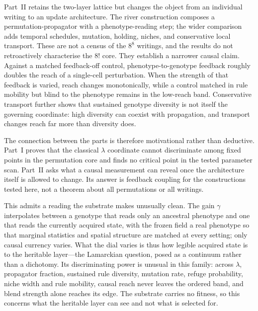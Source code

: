 \documentclass[man,12pt,floatsintext,donotrepeattitle]{apa7}
\begin{document}
Part~II retains the two-layer lattice but changes the object from an individual
writing to an update architecture. The river construction composes a
permutation-propagator with a phenotype-reading step; the wider comparison adds
temporal schedules, mutation, holding, niches, and conservative local
transport. These are not a census of the $8^8$ writings, and the results do not
retroactively characterise the $8!$ core. They establish a narrower causal
claim. Against a matched feedback-off control, phenotype-to-genotype feedback
roughly doubles the reach of a single-cell perturbation. When the strength of
that feedback is varied, reach changes monotonically, while a control matched
in rule mobility but blind to the phenotype remains in the low-reach band.
Conservative transport further shows that sustained genotype diversity is not
itself the governing coordinate: high diversity can coexist with propagation,
and transport changes reach far more than diversity does.

The connection between the parts is therefore motivational rather than
deductive. Part~I proves that the classical $\lambda$ coordinate cannot
discriminate among fixed points in the permutation core and finds no critical
point in the tested parameter scan. Part~II asks what a causal measurement can
reveal once the architecture itself is allowed to change. Its answer is
feedback coupling for the constructions tested here, not a theorem about all
permutations or all writings.

This admits a reading the substrate makes unusually clean. The gain $\gamma$
interpolates between a genotype that reads only an ancestral phenotype and one
that reads the currently acquired state, with the frozen field a real phenotype
so that marginal statistics and spatial structure are matched at every setting;
only causal currency varies. What the dial varies is thus how legible acquired
state is to the heritable layer---the Lamarckian question, posed as a continuum
rather than a dichotomy. Its discriminating power is unusual in this family:
across $\lambda$, propagator fraction, sustained rule diversity, mutation rate,
refuge probability, niche width and rule mobility, causal reach never leaves the
ordered band, and blend strength alone reaches its edge. The substrate carries no
fitness, so this concerns what the heritable layer can see and not what is
selected for.
\end{document}
